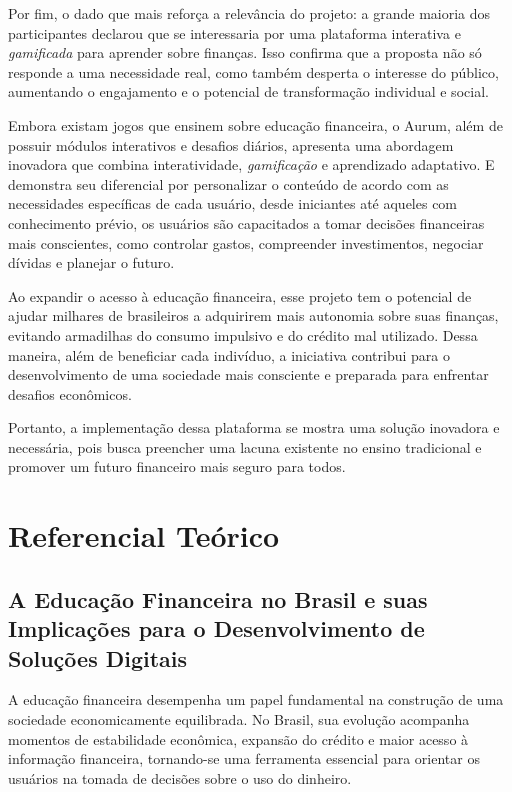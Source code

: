\documentclass[
	article,			%
	12pt,				%
	oneside,			%
	a4paper,			%
	english,			%
	brazil,				%
	sumario=tradicional
	]{abntex2}
\begin{document}
    Por fim, o dado que mais reforça a relevância do projeto: a grande maioria dos participantes declarou que se interessaria por uma plataforma interativa e \textit{gamificada} para aprender sobre finanças. Isso confirma que a proposta não só responde a uma necessidade real, como também desperta o interesse do público, aumentando o engajamento e o potencial de transformação individual e social.

    Embora existam jogos que ensinem sobre educação financeira, o Aurum, além de possuir módulos interativos e desafios diários, apresenta uma abordagem inovadora que combina interatividade, \textit{gamificação} e aprendizado adaptativo. E demonstra seu diferencial por personalizar o conteúdo de acordo com as necessidades específicas de cada usuário, desde iniciantes até aqueles com conhecimento prévio, os usuários são capacitados a tomar decisões financeiras mais conscientes, como controlar gastos, compreender investimentos, negociar dívidas e planejar o futuro.
    
    Ao expandir o acesso à educação financeira, esse projeto tem o potencial de ajudar milhares de brasileiros a adquirirem mais autonomia sobre suas finanças, evitando armadilhas do consumo impulsivo e do crédito mal utilizado. Dessa maneira, além de beneficiar cada indivíduo, a iniciativa contribui para o desenvolvimento de uma sociedade mais consciente e preparada para enfrentar desafios econômicos.

    Portanto, a implementação dessa plataforma se mostra uma solução inovadora e necessária, pois busca preencher uma lacuna existente no ensino tradicional e promover um futuro financeiro mais seguro para todos.


\section{Referencial Teórico}
\subsection{A Educação Financeira no Brasil e suas Implicações para o Desenvolvimento de Soluções Digitais}
    A educação financeira desempenha um papel fundamental na construção de uma sociedade economicamente equilibrada. No Brasil, sua evolução acompanha momentos de estabilidade econômica, expansão do crédito e maior acesso à informação financeira, tornando-se uma ferramenta essencial para orientar os usuários na tomada de decisões sobre o uso do dinheiro.
\end{document}

